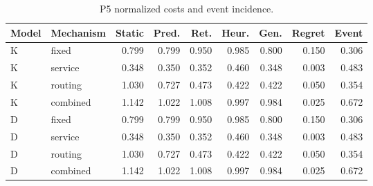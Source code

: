 \begin{table}[htbp]\caption{P5 normalized costs and event incidence.}\centering\small\setlength{\tabcolsep}{3pt}

\begin{tabular}{llrrrrrrr}\toprule

Model & Mechanism & Static & Pred. & Ret. & Heur. & Gen. & Regret & Event\\\midrule

K & fixed & 0.799 & 0.799 & 0.950 & 0.985 & 0.800 & 0.150 & 0.306\\

K & service & 0.348 & 0.350 & 0.352 & 0.460 & 0.348 & 0.003 & 0.483\\

K & routing & 1.030 & 0.727 & 0.473 & 0.422 & 0.422 & 0.050 & 0.354\\

K & combined & 1.142 & 1.022 & 1.008 & 0.997 & 0.984 & 0.025 & 0.672\\

D & fixed & 0.799 & 0.799 & 0.950 & 0.985 & 0.800 & 0.150 & 0.306\\

D & service & 0.348 & 0.350 & 0.352 & 0.460 & 0.348 & 0.003 & 0.483\\

D & routing & 1.030 & 0.727 & 0.473 & 0.422 & 0.422 & 0.050 & 0.354\\

D & combined & 1.142 & 1.022 & 1.008 & 0.997 & 0.984 & 0.025 & 0.672\\

\bottomrule\end{tabular}\end{table}

